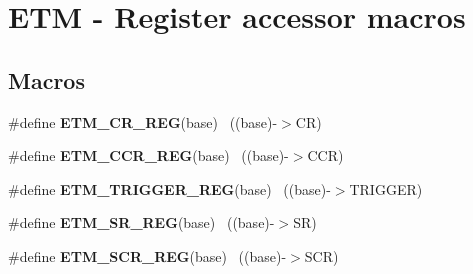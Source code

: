 \hypertarget{group___e_t_m___register___accessor___macros}{}\section{E\+T\+M -\/ Register accessor macros}
\label{group___e_t_m___register___accessor___macros}
\subsection*{Macros}
\begin{DoxyCompactItemize}
\item 
\hypertarget{group___e_t_m___register___accessor___macros_ga7066d0e177775ee655bcca10375aef57}{}\#define {\bfseries E\+T\+M\+\_\+\+C\+R\+\_\+\+R\+E\+G}(base)                                              ~((base)-\/$>$C\+R)\label{group___e_t_m___register___accessor___macros_ga7066d0e177775ee655bcca10375aef57}

\item 
\hypertarget{group___e_t_m___register___accessor___macros_gac577bf385fd3f99d9a8188ab9088dfd8}{}\#define {\bfseries E\+T\+M\+\_\+\+C\+C\+R\+\_\+\+R\+E\+G}(base)                                            ~((base)-\/$>$C\+C\+R)\label{group___e_t_m___register___accessor___macros_gac577bf385fd3f99d9a8188ab9088dfd8}

\item 
\hypertarget{group___e_t_m___register___accessor___macros_gaf1c431dfad05a82a1d959cd58a990a0c}{}\#define {\bfseries E\+T\+M\+\_\+\+T\+R\+I\+G\+G\+E\+R\+\_\+\+R\+E\+G}(base)                                    ~((base)-\/$>$T\+R\+I\+G\+G\+E\+R)\label{group___e_t_m___register___accessor___macros_gaf1c431dfad05a82a1d959cd58a990a0c}

\item 
\hypertarget{group___e_t_m___register___accessor___macros_ga6a4e9d22d51bd337409f36921e9d285d}{}\#define {\bfseries E\+T\+M\+\_\+\+S\+R\+\_\+\+R\+E\+G}(base)                                              ~((base)-\/$>$S\+R)\label{group___e_t_m___register___accessor___macros_ga6a4e9d22d51bd337409f36921e9d285d}

\item 
\hypertarget{group___e_t_m___register___accessor___macros_ga093217f1b3c1f107ad12524096650e20}{}\#define {\bfseries E\+T\+M\+\_\+\+S\+C\+R\+\_\+\+R\+E\+G}(base)                                            ~((base)-\/$>$S\+C\+R)\label{group___e_t_m___register___accessor___macros_ga093217f1b3c1f107ad12524096650e20}


\end{DoxyCompactItemize}
